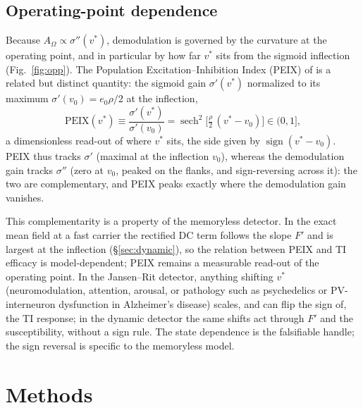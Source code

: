 \documentclass[11pt,a4paper]{article}
\newcommand{\Sig}{\sigma}
\providecommand{\DIFdeltex}[1]{{\protect\color{red} \scriptsize #1}} %
\providecommand{\DIFaddbegin}{} %
\providecommand{\DIFaddend}{} %
\providecommand{\DIFdelbegin}{} %
\providecommand{\DIFdelend}{} %
\providecommand{\DIFdel}[1]{\texorpdfstring{\DIFdeltex{#1}}{}} %
\begin{document}
\subsection{Operating-point dependence}\label{sec:opp}
Because $A_\Omega\propto\Sig''(v^*)$, demodulation is governed by the curvature at
the operating point, and in particular by how far $v^*$ sits from the sigmoid
inflection (Fig.~\ref{fig:opp}). The Population Excitation--Inhibition Index (PEIX)
of \cite{ruffini2025cfc} is a related but distinct quantity: the sigmoid gain
$\Sig'(v^*)$ normalized to its maximum $\Sig'(v_0)=e_0 \rho/2$ at the inflection,
\begin{equation}
\mathrm{PEIX}(v^*)\equiv\frac{\Sig'(v^*)}{\Sig'(v_0)}
=\operatorname{sech}^2\!\Big[\tfrac{\rho}{2}\,(v^*-v_0)\Big]\in(0,1],
\label{eq:peix}
\end{equation}
a dimensionless read-out of where $v^*$ sits, the side given by
$\operatorname{sign}(v^*-v_0)$. PEIX thus tracks $\Sig'$ (maximal at the inflection
$v_0$), whereas the demodulation gain tracks $\Sig''$ (zero at $v_0$, peaked on the
flanks, and sign-reversing across it): the two are complementary, and PEIX peaks
\DIFdelbegin \DIFdel{exactly }\DIFdelend where the demodulation gain vanishes.
\DIFaddbegin 

\DIFaddend This complementarity is a property of the memoryless detector. In the exact mean field at a fast carrier the rectified DC term
follows the slope $F'$ and is largest at the inflection (\S\ref{sec:dynamic}), so the
relation between PEIX and TI efficacy is model-dependent; PEIX remains a measurable
read-out of the operating point. In the Jansen--Rit detector, anything shifting $v^*$
(neuromodulation, attention, arousal, or pathology such as psychedelics or PV-interneuron
dysfunction in Alzheimer's disease) scales, and can flip the sign of, the TI response; in
the dynamic detector the same shifts act through $F'$ and the susceptibility, without a
sign rule. The state dependence is the falsifiable handle; the sign reversal is specific
to the memoryless model.


\section{Methods}
\end{document}
